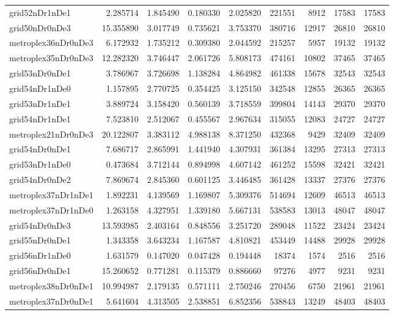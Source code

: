 \documentclass[../../../thesis.tex]{subfiles}
\begin{document}
\begin{longtable}{|l|r|r|r|r|r|r|r|r|}
grid52nDr1nDe1 & 2.285714 & 1.845490 & 0.180330 & 2.025820 & 221551 & 8912 & 17583 & 17583 \\
grid50nDr0nDe3 & 15.355890 & 3.017749 & 0.735621 & 3.753370 & 380716 & 12917 & 26810 & 26810 \\
metroplex36nDr0nDe3 & 6.172932 & 1.735212 & 0.309380 & 2.044592 & 215257 & 5957 & 19132 & 19132 \\
metroplex35nDr0nDe3 & 12.282320 & 3.746447 & 2.061726 & 5.808173 & 474161 & 10802 & 37465 & 37465 \\
grid53nDr0nDe1 & 3.786967 & 3.726698 & 1.138284 & 4.864982 & 461338 & 15678 & 32543 & 32543 \\
grid54nDr1nDe0 & 1.157895 & 2.770725 & 0.354425 & 3.125150 & 342548 & 12855 & 26365 & 26365 \\
grid53nDr1nDe1 & 3.889724 & 3.158420 & 0.560139 & 3.718559 & 399804 & 14143 & 29370 & 29370 \\
grid54nDr1nDe1 & 7.523810 & 2.512067 & 0.455567 & 2.967634 & 315055 & 12083 & 24727 & 24727 \\
metroplex21nDr0nDe3 & 20.122807 & 3.383112 & 4.988138 & 8.371250 & 432368 & 9429 & 32409 & 32409 \\
grid54nDr0nDe1 & 7.686717 & 2.865991 & 1.441940 & 4.307931 & 361384 & 13295 & 27313 & 27313 \\
grid53nDr1nDe0 & 0.473684 & 3.712144 & 0.894998 & 4.607142 & 461252 & 15598 & 32421 & 32421 \\
grid54nDr0nDe2 & 7.869674 & 2.845360 & 0.601125 & 3.446485 & 361428 & 13337 & 27376 & 27376 \\
metroplex37nDr1nDe1 & 1.892231 & 4.139569 & 1.169807 & 5.309376 & 514694 & 12609 & 46513 & 46513 \\
metroplex37nDr1nDe0 & 1.263158 & 4.327951 & 1.339180 & 5.667131 & 538583 & 13013 & 48047 & 48047 \\
grid54nDr0nDe3 & 13.593985 & 2.403164 & 0.848556 & 3.251720 & 289048 & 11522 & 23424 & 23424 \\
grid55nDr0nDe1 & 1.343358 & 3.643234 & 1.167587 & 4.810821 & 453449 & 14488 & 29928 & 29928 \\
grid56nDr1nDe0 & 1.631579 & 0.147020 & 0.047428 & 0.194448 & 18374 & 1574 & 2516 & 2516 \\
grid56nDr0nDe1 & 15.260652 & 0.771281 & 0.115379 & 0.886660 & 97276 & 4977 & 9231 & 9231 \\
metroplex38nDr0nDe1 & 10.994987 & 2.179135 & 0.571111 & 2.750246 & 270456 & 6750 & 21961 & 21961 \\
metroplex37nDr0nDe1 & 5.641604 & 4.313505 & 2.538851 & 6.852356 & 538843 & 13249 & 48403 & 48403 \\

\end{longtable}
\end{document}
